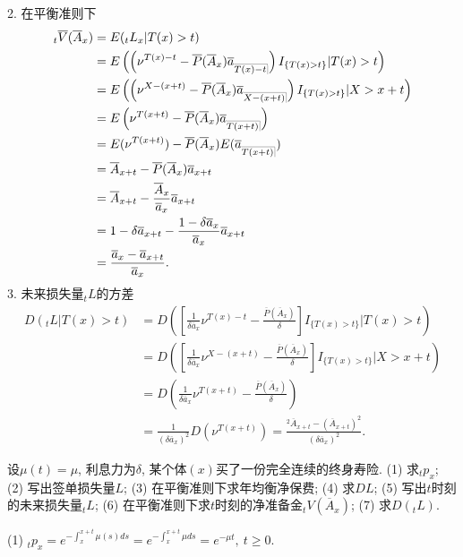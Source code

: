 \documentclass[a4paper,openany, 10pt]{ctexbook}
\makeatletter
\def\z{\left}
\def\y{\right}
\DeclareRobustCommand{\annu}[1]{_{%
    \def\arraystretch{0}%
    \setlength\arraycolsep{1pt}%
    \setlength\arrayrulewidth{.2pt}%
    \begin{array}[b]{@{}c|}\hline
        \\[\arraycolsep]%
        \scriptstyle #1%
    \end{array}%
}}
\makeatother
\begin{document}
2. 在平衡准则下
\begin{align*}
    {}_t\overline V(\overline A_x)&=E({}_tL_x|T(x)>t) \\
                        &=E\z(\z(\nu^{T(x)-t}-\overline{P}( \overline{A}_x )\overline a_{\annu {T(x)-t}}\y)I_{\{T(x)>t\}}|T(x)>t\y)\\
                        &=E\z(\z(\nu^{X-(x+t)}-\overline{P}( \overline{A}_x )\overline a_{\annu {X-(x+t)}}\y)I_{\{T(x)>t\}}|X>x+t\y)\\
                        &=E\z(\nu^{T(x+t)}-\overline{P}( \overline{A}_x )\overline a_{\annu {T(x+t)}}\y)\\
                        &=E(\nu^{T(x+t)})-\overline{P}( \overline{A}_x )E(\overline a_{\annu {T(x+t)}})\\
                        &=\overline A_{x+t}-\overline{P}( \overline{A}_x )\overline a_{x+t}\\
                        &=\overline A_{x+t}-\frac{\overline A_x}{\overline a_x}\overline a_{x+t}\\
                        &=1-\delta\overline a_{x+t}-\frac{1-\delta \overline a_x}{\overline a_x}\overline a_{x+t}\\
                        &=\frac{\overline a_x-\overline a_{x+t}}{\overline a_x}.
\end{align*}
3. 未来损失量$_tL$的方差
\begin{align*}
    D(_tL|T(x)>t) &=D\z(\z[\frac{1}{\delta\overline{a}_x}\nu^{T(x)-t}-\frac{\overline{P}( \overline{A}_x )}{\delta}\y]I_{\{T(x)>t\}}|T(x)>t\y)\\
                        &=D\z(\z[\frac{1}{\delta\overline{a}_x}\nu^{X-(x+t)}-\frac{\overline{P}( \overline{A}_x )}{\delta}\y]I_{\{T(x)>t\}}|X>x+t\y)\\
                        &=D\z(\frac{1}{\delta\overline{a}_x}\nu^{T(x+t)}-\frac{\overline{P}( \overline{A}_x )}{\delta}\y)\\
                        &=\frac{1}{(\delta\overline a_x)^2}D(\nu^{T(x+t)})=\frac{^2\overline A_{x+t}-(\overline A_{x+t})^2}{(\delta\overline a_x)^2}.                 \end{align*}

\begin{example}\label{l5.1}
    设$\mu(t)=\mu$, 利息力为$\delta$, 某个体$(x)$买了一份完全连续的终身寿险.
    (1) 求${}_tp_x$; (2) 写出签单损失量$L$;  (3) 在平衡准则下求年均衡净保费; (4) 求$DL$;
    (5) 写出$t$时刻的未来损失量${}_tL$;
    (6) 在平衡准则下求$t$时刻的净准备金$_tV(\overline A_x)$;
    (7) 求$D({}_tL).$

\end{example}
\solution
(1) $_tp_x=e^{-\int_x^{x+t}\mu(s)ds}=e^{-\int_x^{x+t}\mu ds}=e^{-\mu t},\ t\ge 0.$
\end{document}
